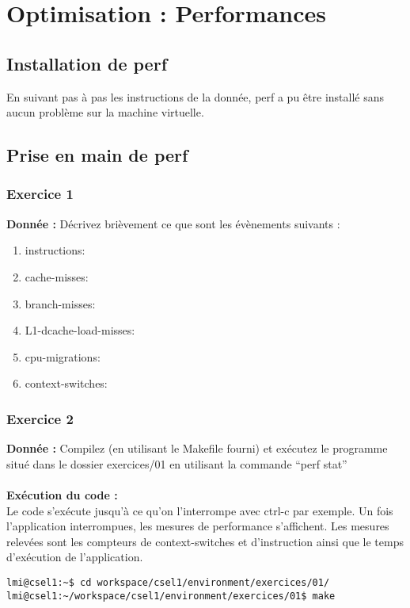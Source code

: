 \section{Optimisation : Performances}
\subsection{Installation de perf}
En suivant pas à pas les instructions de la donnée, perf a pu être installé sans aucun problème sur la machine virtuelle.
\subsection{Prise en main de perf}
\subsubsection{Exercice 1}
\textbf{Donnée : } Décrivez	brièvement	ce	que	sont	les	évènements	suivants	:
\begin{enumerate}
	\item instructions:
	\item cache-misses:
	\item branch-misses:
	\item L1-dcache-load-misses:
	\item cpu-migrations:
	\item context-switches:
\end{enumerate}

\subsubsection{Exercice 2}
\textbf{Donnée : } Compilez	(en	utilisant	le	Makefile	fourni)	et	exécutez	le	programme	situé	dans	le	dossier	exercices/01	
en	utilisant	la	commande	“perf	stat”
\\\\

\textbf{Exécution du code : } \\
Le code s'exécute jusqu'à ce qu'on l'interrompe avec ctrl-c par exemple. Un fois l'application interrompues, les mesures de performance s'affichent. Les mesures relevées sont les compteurs de context-switches et d'instruction ainsi que le temps d'exécution de l'application.\\
\begin{lstlisting}
lmi@csel1:~$ cd workspace/csel1/environment/exercices/01/
lmi@csel1:~/workspace/csel1/environment/exercices/01$ make
\end{lstlisting}

